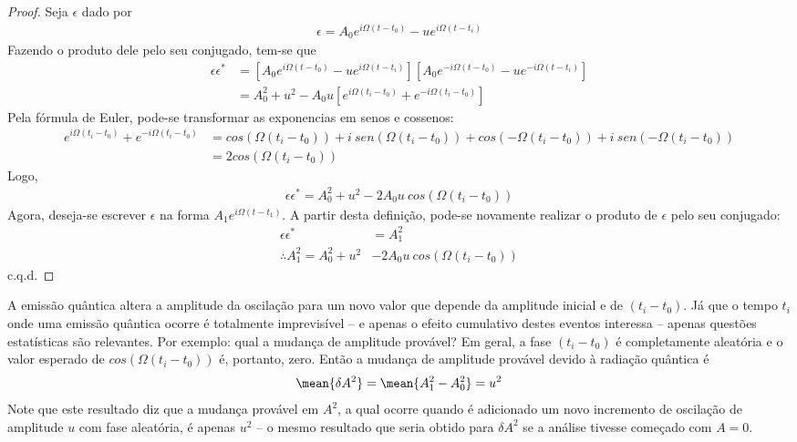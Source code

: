 \begin{proof}
	Seja $\epsilon$ dado por
	\begin{align*}
		\epsilon = A_0 e^{i\Omega(t-t_0)} - ue^{i\Omega(t-t_i)}
	\end{align*}
	Fazendo o produto dele pelo seu conjugado, tem-se que
	\begin{align*}
		\epsilon \epsilon^* &= [A_0 e^{i\Omega(t-t_0)} - ue^{i\Omega(t-t_i)}][A_0 e^{-i\Omega(t-t_0)} - ue^{-i\Omega(t-t_i)}]\\
							&= A_0^2 + u^2 - A_0 u[e^{i\Omega(t_i-t_0)} + e^{-i\Omega(t_i-t_0)}]
	\end{align*}
	Pela fórmula de Euler, pode-se transformar as exponencias em senos e cossenos:
	\begin{align*}
		e^{i\Omega(t_i-t_0)} + e^{-i\Omega(t_i-t_0)} &= cos(\Omega(t_i-t_0)) + i\ sen(\Omega(t_i-t_0)) + cos(-\Omega(t_i-t_0)) + i\ sen(-\Omega(t_i-t_0))\\
		&= 2cos(\Omega(t_i-t_0))
	\end{align*}
	Logo,
	\begin{align*}
		\epsilon \epsilon^* = A_0^2 + u^2 - 2A_0u\ cos(\Omega(t_i-t_0))
	\end{align*}
	Agora, deseja-se escrever $\epsilon$ na forma $A_1e^{i\Omega(t-t_1)}$. A partir desta definição, pode-se novamente realizar o produto de $\epsilon$ pelo seu conjugado:
	\begin{align*}
		\epsilon \epsilon^* &= A_1^2\\
		\therefore A_1^2 = A_0^2 + u^2 &- 2A_0u\ cos(\Omega(t_i-t_0))
	\end{align*}
	c.q.d.
\end{proof}

A emissão quântica altera a amplitude da oscilação para um novo valor que depende da amplitude inicial e de $(t_i-t_0)$. Já que o tempo $t_i$ onde uma emissão quântica ocorre é totalmente imprevisível -- e apenas o efeito cumulativo destes eventos interessa -- apenas questões estatísticas são relevantes. Por exemplo: qual a mudança de amplitude provável? Em geral, a fase $(t_i-t_0)$ é completamente aleatória e o valor esperado de $cos(\Omega(t_i-t_0))$ é, portanto, zero. Então a mudança de amplitude provável devido à radiação quântica é
\begin{align}
	\mean{\delta A^2} = \mean{A_1^2 - A_0^2} = u^2
\end{align}
Note que este resultado diz que a mudança provável em $A^2$, a qual ocorre quando é adicionado um novo incremento de oscilação de amplitude $u$ com fase aleatória, é apenas $u^2$ -- o mesmo resultado que seria obtido para $\delta A^2$ se a análise tivesse começado com $A=0$.

